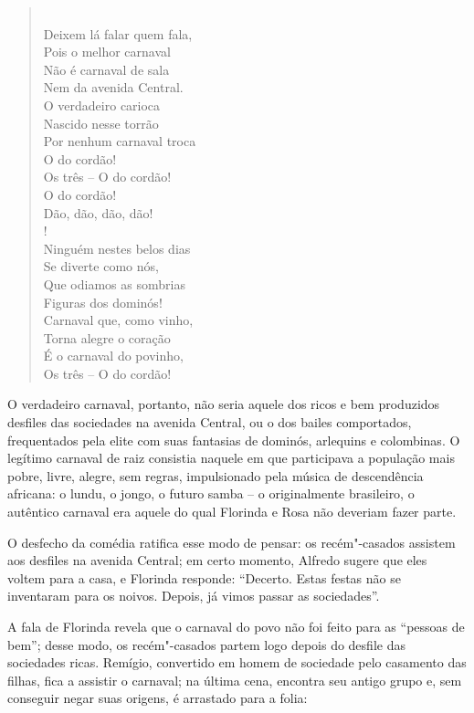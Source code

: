 \begin{hedraquote} 
\begin{verse}
\hspace{-1cm}\\ 
Deixem lá falar quem fala,\\
Pois o melhor carnaval\\
Não é carnaval de sala\\
Nem da avenida Central.\\
O verdadeiro carioca\\
Nascido nesse torrão\\
Por nenhum carnaval troca\\
O do cordão!\\
Os três -- O do cordão!\\
O do cordão!\\
Dão, dão, dão, dão!\\!
\hspace{-1cm} \\
Ninguém nestes belos dias\\
Se diverte como nós,\\
Que odiamos as sombrias\\
Figuras dos dominós!\\
Carnaval que, como vinho,\\
Torna alegre o coração\\
É o carnaval do povinho,\\
Os três -- O do cordão! 
\end{verse}
\end{hedraquote} 

O verdadeiro carnaval, portanto, não seria aquele dos ricos e bem
produzidos desfiles das sociedades na avenida Central, ou o dos bailes
comportados, frequentados pela elite com suas fantasias de dominós,
arlequins e colombinas. O legítimo carnaval de raiz consistia naquele
em que participava a população mais pobre, livre, alegre, sem regras,
impulsionado pela música de descendência africana: o lundu, o jongo, o
futuro samba -- o originalmente brasileiro, o autêntico carnaval era
aquele do qual Florinda e Rosa não deveriam fazer parte. 

O desfecho da comédia ratifica esse modo de pensar: os recém"-casados
assistem aos desfiles na avenida Central; em certo momento, Alfredo
sugere que eles voltem para a casa, e Florinda responde:
``Decerto. Estas festas não se inventaram para os noivos. Depois, já
vimos passar as sociedades''.

A fala de Florinda revela que o carnaval do povo não foi feito para as
“pessoas de bem”; desse modo, os recém"-casados partem logo depois do
desfile das sociedades ricas. Remígio, convertido em homem de sociedade
pelo casamento das filhas, fica a assistir o carnaval; na última cena,
encontra seu antigo grupo e, sem conseguir negar suas origens, é
arrastado para a folia:

